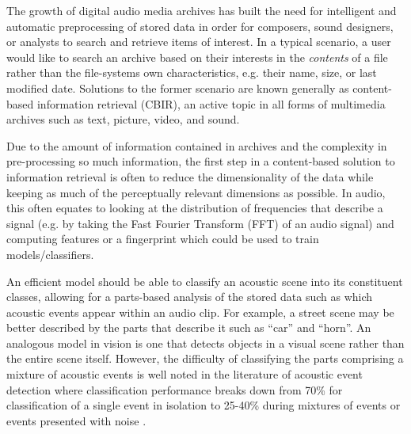 \documentclass[a4paper,10pt,final]{ThesisStyle}
\begin{document}
The growth of digital audio media archives has built the need for intelligent and automatic preprocessing of stored data in order for composers, sound designers, or analysts to search and retrieve items of interest.  In a typical scenario, a user would like to search an archive based on their interests in the \textit{contents} of a file rather than the file-systems own characteristics, e.g. their name, size, or last modified date.  Solutions to the former scenario are known generally as content-based information retrieval (CBIR), an active topic in all forms of multimedia archives such as text, picture, video, and sound. 

Due to the amount of information contained in archives and the complexity in pre-processing so much information, the first step in a content-based solution to information retrieval is often to reduce the dimensionality of the data while keeping as much of the perceptually relevant dimensions as possible.  In audio, this often equates to looking at the distribution of frequencies that describe a signal (e.g. by taking the Fast Fourier Transform (FFT) of an audio signal) and computing features or a fingerprint which could be used to train models/classifiers.

An efficient model should be able to classify an acoustic scene into its constituent classes, allowing for a parts-based analysis of the stored data such as which acoustic events appear within an audio clip.  For example, a street scene may be better described by the parts that describe it such as ``car'' and ``horn''.  An analogous model in vision is one that detects objects in a visual scene rather than the entire scene itself.  However, the difficulty of classifying the parts comprising a mixture of acoustic events is well noted in the literature of acoustic event detection where classification performance breaks down from 70\% for classification of a single event in isolation to 25-40\% during mixtures of events or events presented with noise \cite{Temko2007}. 

\end{document}
